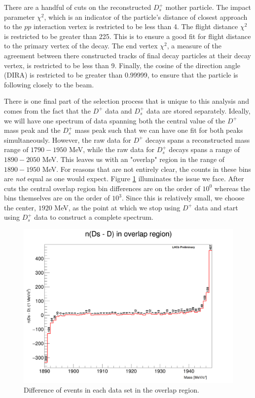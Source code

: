 \documentclass[12pt, letterpaper]{article}
\begin{document}
There are a handful of cuts on the reconstructed $D^+_s$ mother particle. The impact parameter $\chi^2$, which is an indicator of the particle's distance of closest approach to the $pp$ interaction vertex is restricted to be less than 4. The flight distance $\chi^2$ is restricted to be greater than 225. This is to ensure a good fit for flight distance to the primary vertex of the decay. The end vertex $\chi^2$, a measure of the agreement between there constructed tracks of final decay particles at their decay vertex, is restricted to be less than 9. Finally, the cosine of the direction angle (DIRA) is restricted to be greater than 0.99999, to ensure that the particle is following closely to the beam.


There is one final part of the selection process that is unique to this analysis and comes from the fact that the $D^+$ data and $D^+_s$ data are stored separately. Ideally, we will have one spectrum of data spanning both the central value of the $D^+$ mass peak and the $D^+_s$ mass peak such that we can have one fit for both peaks simultaneously. However, the raw data for $D^+$ decays spans a reconstructed mass range of $1790 - 1950$ MeV, while the raw data for $D^+_s$ decays spans a range of $1890-2050$ MeV. This leaves us with an "overlap" region in the range of $1890 - 1950$ MeV. For reasons that are not entirely clear, the counts in these bins are \textit{not} equal as one would expect. Figure \ref{fig:overlap} illuminates the issue we face. After cuts the central overlap region bin differences are on the order of $10^0$ whereas the bins themselves are on the order of $10^3$. Since this is relatively small, we choose the center, $1920$ MeV, as the point at which we stop using $D^+$ data and start using $D^+_s$ data to construct a complete spectrum.


\begin{figure}[h!]
\centering
\includegraphics[width=0.6\linewidth]{overlap.png}
\caption{Difference of events in each data set in the overlap region.}
\label{fig:overlap}
\end{figure}
\end{document}
